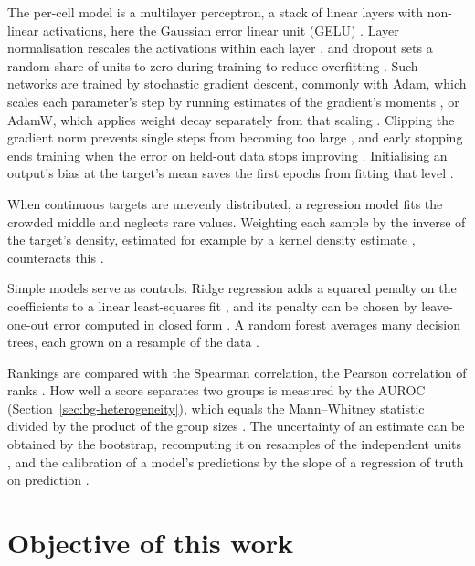 The per-cell model is a multilayer perceptron, a stack of linear layers with non-linear activations, here
the Gaussian error linear unit (GELU) \cite{hendrycks2016gelu}. Layer normalisation rescales the
activations within each layer \cite{ba2016layernorm}, and dropout sets a random share of units to zero
during training to reduce overfitting \cite{srivastava2014}. Such networks are trained by stochastic
gradient descent, commonly with Adam, which scales each parameter's step by running estimates of the
gradient's moments \cite{kingma2015adam}, or AdamW, which applies weight decay separately from that
scaling \cite{loshchilov2019adamw}. Clipping the gradient norm prevents single steps from becoming too
large \cite{pascanu2013}, and early stopping ends training when the error on held-out data stops
improving \cite{prechelt1998}. Initialising an output's bias at the target's mean saves the first epochs
from fitting that level \cite{lin2017focal}.

When continuous targets are unevenly distributed, a regression model fits the crowded middle and neglects
rare values. Weighting each sample by the inverse of the target's density, estimated for example by a
kernel density estimate \cite{scott1992}, counteracts this \cite{dir,denseweight}.

Simple models serve as controls. Ridge regression adds a squared penalty on the coefficients to a linear
least-squares fit \cite{hoerl1970}, and its penalty can be chosen by leave-one-out error computed in
closed form \cite{hastie2009,pedregosa2011}. A random forest averages many decision trees, each grown on a
resample of the data \cite{breiman2001}.

Rankings are compared with the Spearman correlation, the Pearson correlation of ranks
\cite{spearman1904}. How well a score separates two groups is measured by the AUROC (Section~\ref{sec:bg-heterogeneity}), which equals the Mann--Whitney statistic divided by the product of
the group sizes \cite{mannwhitney1947,hanley1982}. The uncertainty of an estimate can be obtained by the
bootstrap, recomputing it on resamples of the independent units \cite{efron1993}, and the calibration of
a model's predictions by the slope of a regression of truth on prediction \cite{vancalster2016}.

\section{Objective of this work}
\label{sec:bg-objective}

